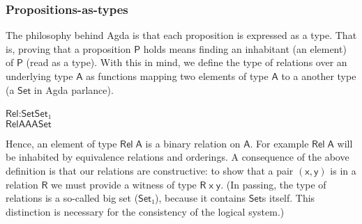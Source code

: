 \documentclass{CSML}
\numberwithin{theorem}{section}
\newcommand{\Conid}[1]{\mathit{#1}}
\newcommand{\Varid}[1]{\mathit{#1}}
\def\resethooks{\global\let\SaveRestoreHook\empty
  \global\let\ColumnHook\empty}
\let\hspost\empty
\renewcommand\Varid[1]{\ensuremath{\mathsf{#1}}}
\renewcommand\Conid[1]{\ensuremath{\mathsf{#1}}}
\begin{document}
\subsubsection*{Propositions-as-types}
The philosophy behind Agda is that each proposition is expressed as a
type.
That is, proving that a proposition \ensuremath{\Conid{P}} holds means finding an
inhabitant (an element) of \ensuremath{\Conid{P}} (read as a type).
With this in mind, we define the type of relations over an underlying
type \ensuremath{\Conid{A}} as functions mapping two elements of type \ensuremath{\Conid{A}} to a another
type (a \ensuremath{\Conid{Set}} in Agda parlance).
\begin{hscode}\SaveRestoreHook
\column{B}{@{}>{\hspre}l<{\hspost}@{}}\column{8}{@{}>{\hspre}l<{\hspost}@{}}\column{11}{@{}>{\hspre}l<{\hspost}@{}}\column{E}{@{}>{\hspre}l<{\hspost}@{}}\>[B]{}\Conid{Rel}\;\!:\!\;\Conid{Set}\;\to \;\Conid{Set₁}{}\<[E]\\
\>[B]{}\Conid{Rel}\;\Conid{A}\;{}\<[8]\>[8]{}\mathrel{=}\;{}\<[11]\>[11]{}\Conid{A}\;\to \;\Conid{A}\;\to \;\Conid{Set}{}\<[E]\ColumnHook
\end{hscode}\resethooks
Hence, an element of type \ensuremath{\Conid{Rel}\;\Conid{A}} is a binary relation on \ensuremath{\Conid{A}}.
For example \ensuremath{\Conid{Rel}\;\Conid{A}} will be inhabited by equivalence relations and orderings.
A consequence of the above definition is that our relations are
constructive:
to show that a pair \ensuremath{(\Varid{x,y})} is in a relation \ensuremath{\Conid{R}} we must provide a
witness of type \ensuremath{\Conid{R}\;\Varid{x}\;\Varid{y}}.
(In passing, the type of relations is a so-called big set (\ensuremath{\Conid{Set₁}}),
because it contains \ensuremath{\Conid{Set}}s itself.
This distinction is necessary for the consistency of the logical
system.)
\end{document}
